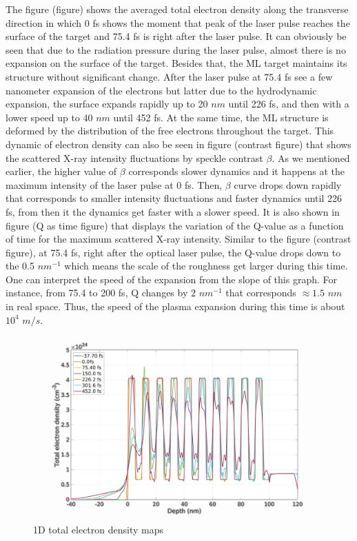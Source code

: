 \documentclass[preprint, 12pt]{elsarticle}
\begin{document}
The figure (figure) shows the averaged total electron density along the
transverse direction in which 0 fs shows the moment that peak of the laser pulse
reaches the surface of the target and 75.4 fs is right after the laser pulse. It
can obviously be seen that due to the radiation pressure during the laser pulse,
almost there is no expansion on the surface of the target. Besides that, the ML
target maintains its structure without significant change. After the laser pulse
at 75.4 fs see a few nanometer expansion of the electrons but latter due to the
hydrodynamic expansion, the surface expands rapidly up to 20 $nm$  until 226 fs,
and then with a lower speed up to 40 $nm$ until 452 fs. At the same time, the ML
structure is deformed by the distribution of the free electrons throughout the
target. This dynamic of electron density can also be seen in figure (contrast
figure) that shows the scattered X-ray intensity fluctuations by speckle
contrast $\beta$. As we mentioned earlier, the higher value of $\beta$
corresponds slower dynamics and it happens at the maximum intensity of the laser
pulse at 0 fs. Then, $\beta$ curve drops down rapidly that corresponds to
smaller intensity fluctuations and faster dynamics until 226 fs, from then it
the dynamics get faster with a slower speed. It is also shown in figure (Q as
time figure) that displays the variation of the Q-value as a function of time
for the maximum scattered X-ray intensity. Similar to the figure (contrast
figure), at 75.4 fs, right after the optical laser pulse, the Q-value drops down
to the 0.5 $nm^{-1}$ which means the scale of the roughness get larger during
this time. One can interpret the speed of the expansion from the slope of this
graph. For instance, from 75.4 to 200 fs, Q changes by 2 $nm^{-1}$ that
corresponds $\approx 1.5$ $nm$ in real space. Thus, the speed of the plasma
expansion during this time is about $10^{4}$ $m/s$.

\begin{figure}[h]
\centering\includegraphics[width=0.8\linewidth]{Paper_plot_1D.png}
\caption{1D total electron density maps}
\end{figure}
\end{document}
